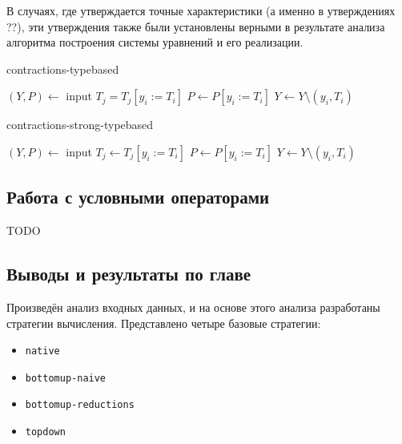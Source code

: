 \documentclass[../diploma.tex]{subfiles}
\begin{document}
В случаях, где утверждается точные характеристики (а именно в утверждениях ??), эти утверждения также были установлены верными в результате анализа алгоритма построения системы уравнений и его реализации. 

\begin{megaalgorithm}
    \caption{contractions-typebased}
  \begin{algorithmic}
    \State $(Y, P)\gets$ input
        \If{\textcolor{red}{$typeof(y_i)$ is $LocalStateMapping$ or $FieldType$}}
                \State $T_j = T_j [y_i := T_i]$
            \EndFor
            \State $P \gets P [y_i := T_i]$
            \State $Y\gets Y \setminus (y_i, T_i)$
        \EndIf
    \EndFor
    \State {}
  \end{algorithmic}
\end{megaalgorithm} 

\begin{megaalgorithm}
    \caption{contractions-strong-typebased}
  \begin{algorithmic}
    \State $(Y, P)\gets$ input
        \If{\textcolor{red}{$typeof(y_i)$ is not $Ledger$}}
                \State $T_j \gets T_j [y_i := T_i]$
            \EndFor
            \State $P \gets P [y_i := T_i]$
            \State $Y\gets Y \setminus (y_i, T_i)$
        \EndIf
    \EndFor
    \State {}
  \end{algorithmic}
\end{megaalgorithm}  

\subsection{Работа с условными операторами}

TODO

\subsection{Выводы и результаты по главе}

Произведён анализ входных данных, и на основе этого анализа разработаны стратегии вычисления. Представлено четыре базовые стратегии:
\begin{itemize}
    \item \texttt{native}
    \item \texttt{bottomup-naive}
    \item \texttt{bottomup-reductions}
    \item \texttt{topdown}
\end{itemize}
\end{document}
